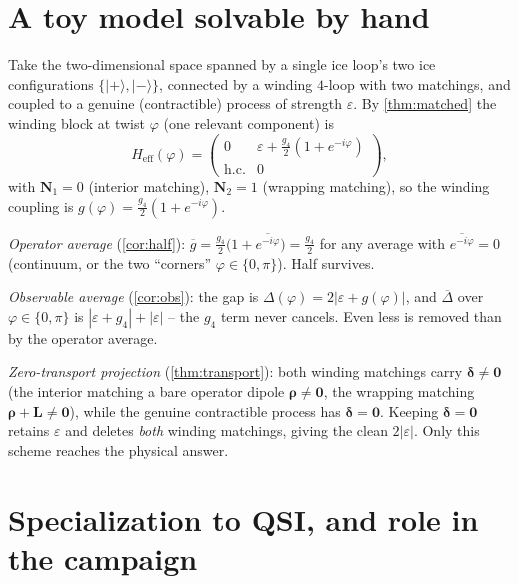 \documentclass[11pt,letterpaper]{article}
\newcommand{\bN}{\mathbf{N}}
\newcommand{\bL}{\mathbf{L}}
\newcommand{\brho}{\bm{\rho}}
\newcommand{\bdelta}{\bm{\delta}}
\newcommand{\Heff}{H_{\mathrm{eff}}}
\newcommand{\gfour}{g_{4}}
\theoremstyle{plain}
\theoremstyle{definition}
\begin{document}
\section{A toy model solvable by hand}
\label{sec:toy}

Take the two-dimensional space spanned by a single ice loop's two
ice configurations $\{|{+}\rangle,|{-}\rangle\}$, connected by a winding
$4$-loop with two matchings, and coupled to a genuine (contractible)
process of strength $\varepsilon$. By \cref{thm:matched} the winding
block at twist $\varphi$ (one relevant component) is
\begin{equation}
\Heff(\varphi)=
\begin{pmatrix} 0 & \varepsilon+\tfrac{\gfour}{2}(1+e^{-i\varphi})\\[2pt]
\text{h.c.} & 0\end{pmatrix},
\end{equation}
with $\bN_1=0$ (interior matching), $\bN_2=1$ (wrapping matching), so
the winding coupling is $g(\varphi)=\tfrac{\gfour}{2}(1+e^{-i\varphi})$.

\emph{Operator average} (\cref{cor:half}):
$\overline{g}=\tfrac{\gfour}{2}\bigl(1+\overline{e^{-i\varphi}}\bigr)
=\tfrac{\gfour}{2}$ for any average with $\overline{e^{-i\varphi}}=0$
(continuum, or the two ``corners'' $\varphi\in\{0,\pi\}$). Half survives.

\emph{Observable average} (\cref{cor:obs}): the gap is
$\Delta(\varphi)=2|\varepsilon+g(\varphi)|$, and
$\overline{\Delta}$ over $\varphi\in\{0,\pi\}$ is
$|\varepsilon+\gfour|+|\varepsilon|$ -- the $\gfour$ term never cancels.
Even less is removed than by the operator average.

\emph{Zero-transport projection} (\cref{thm:transport}): both winding
matchings carry $\bdelta\ne\bm0$ (the interior matching a bare operator
dipole $\brho\ne\bm0$, the wrapping matching $\brho+\bL\ne\bm0$), while
the genuine contractible process has $\bdelta=\bm0$. Keeping
$\bdelta=\bm0$ retains $\varepsilon$ and deletes \emph{both} winding
matchings, giving the clean $2|\varepsilon|$. Only this scheme reaches
the physical answer.

\section{Specialization to QSI, and role in the campaign}
\label{sec:qsi}
\end{document}
